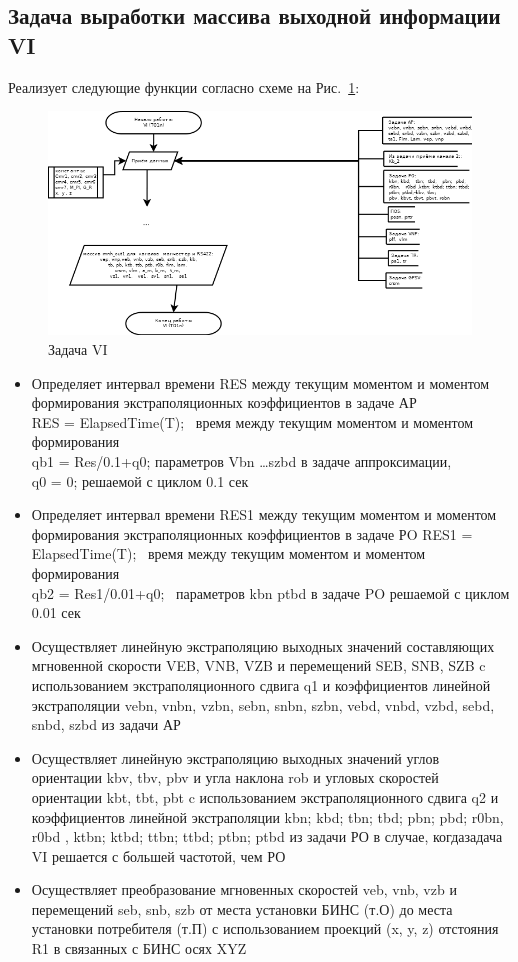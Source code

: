 \subsection{Задача выработки массива выходной информации VI}
Реализует следующие функции согласно схеме на Рис.~\ref{fig:VI}:
\begin{figure}[H]
    \centering
    \includegraphics[width=0.75\linewidth]{images/VI_simple.png}
    \caption{Задача VI}
    \label{fig:VI}
\end{figure}
\begin{itemize}
    \item Определяет интервал времени RES  между текущим моментом и  моментом формирования экстраполяционных  коэффициентов в  задаче АР \\
RES = ElapsedTime(T);  \ время между текущим моментом  и моментом формирования \\
            qb1 = Res/0.1+q0;   параметров   Vbn …szbd в задаче аппроксимации, \\
            q0 = 0;             решаемой с циклом 0.1 сек \\
    \item Определяет   интервал времени  RES1  между текущим моментом  и  моментом формирования экстраполяционных  коэффициентов в  задаче   РO 
RES1 = ElapsedTime(T);  \ время между текущим моментом и моментом формирования \\
            qb2 = Res1/0.01+q0;       \ параметров  kbn   ptbd в задаче PO решаемой с циклом 0.01 сек
    \item Осуществляет  линейную  экстраполяцию  выходных  значений  составляющих  мгновенной скорости  VEB,  VNB, VZB  и  перемещений  
    SEB,  SNB,  SZB  c  использованием экстраполяционного сдвига q1  и  коэффициентов   линейной  экстраполяции vebn, vnbn, vzbn, sebn, snbn, szbn, 
    vebd, vnbd, vzbd, sebd, snbd, szbd   из задачи АР
    \item Осуществляет  линейную  экстраполяцию  выходных  значений углов  ориентации  kbv,  tbv,  pbv  и угла наклона  rob  и  
    угловых скоростей  ориентации kbt,  tbt,  pbt c  использованием экстраполяционного сдвига   q2  и  коэффициентов   линейной 
    экстраполяции      kbn;   kbd;   tbn;   tbd;   pbn;   pbd;    r0bn,   r0bd , ktbn;  ktbd;  ttbn;   ttbd;  ptbn;   ptbd     
    из задачи РО   в  случае,  когдазадача VI  решается  с  большей  частотой,  чем   РО 
    \item Осуществляет преобразование мгновенных скоростей veb, vnb, vzb и перемещений   seb, snb, szb от места установки БИНС  (т.О) 
    до места установки потребителя (т.П) с использованием проекций (x, y, z) отстояния R1 в связанных с БИНС  осях XYZ 
\end{itemize}
